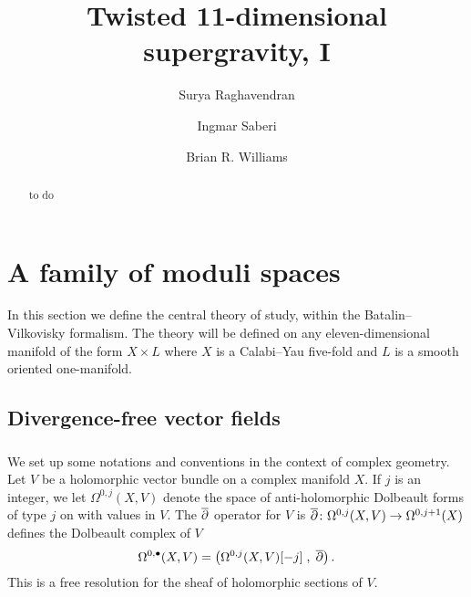 \documentclass[11pt]{amsart}
\begin{document}
\title{Twisted 11-dimensional supergravity, I}
\author{Surya Raghavendran}
\address{Perimeter Institute for Theoretical Physics \\ 31 Caroline Street North \\ 
Waterloo, Ontario N2L 2Y5\\ Canada}
\author{Ingmar Saberi}
\address{Ludwig-Maximilians-Universit\"at M\"unchen \\ Fakult\"at f\"ur Physik \\ Theresienstra\ss{}e 37 \\ 80333 M\"unchen \\ Deutschland}
\author{Brian R. Williams}
\address{School of Mathematics \\ University of Edinburgh \\ Edinburgh EH9 3FD \\ Scotland}
\begin{abstract}
to do
\end{abstract}
\maketitle

\newpage 

\section{A family of moduli spaces} 

In this section we define the central theory of study, within the Batalin--Vilkovisky formalism.
The theory will be defined on any eleven-dimensional manifold of the form $X \times L$ where $X$ is a Calabi--Yau five-fold and $L$ is a smooth oriented one-manifold.

\subsection{Divergence-free vector fields} 

\subsubsection{}
\label{sec:divfree}
We set up some notations and conventions in the context of complex geometry. 
Let $V$ be a holomorphic vector bundle on a complex manifold $X$. 
If $j$ is an integer, we let $\Omega^{0,j}(X, V)$ denote the space of anti-holomorphic Dolbeault forms of type $j$ on with values in $V$.
The $\overline{\partial}$ operator for $V$ is $\overline{\partial} \colon \Omega^{0,j}(X, V)\to \Omega^{0,j+1}(X)$ defines the Dolbeault complex of $V$
\[
  \Omega^{0,\bullet}(X, V) = \left(\Omega^{0,j}(X, V)[-j] \; , \; \overline{\partial}\right) .
\]
This is a free resolution for the sheaf of holomorphic sections of $V$.
\end{document}

